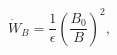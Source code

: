\begin{equation}
\dot W_B = \frac{1}{\epsilon}\left(\frac{B_0}{B}\right)^2, \label{Bspeed}
\end{equation}

